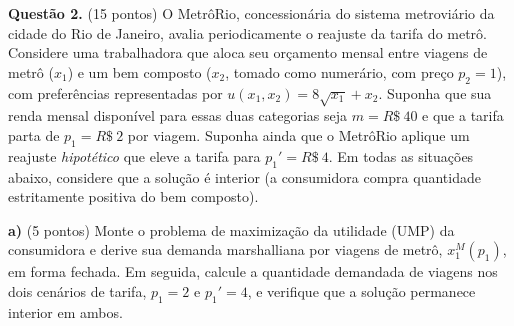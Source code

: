 
\textbf{Questão 2.} (15 pontos) O MetrôRio, concessionária do sistema metroviário da cidade do Rio de Janeiro, avalia periodicamente o reajuste da tarifa do metrô. Considere uma trabalhadora que aloca seu orçamento mensal entre viagens de metrô ($x_1$) e um bem composto ($x_2$, tomado como numerário, com preço $p_2=1$), com preferências representadas por $u(x_1,x_2)=8\sqrt{x_1}+x_2$. Suponha que sua renda mensal disponível para essas duas categorias seja $m=R\$~40$ e que a tarifa parta de $p_1=R\$~2$ por viagem. Suponha ainda que o MetrôRio aplique um reajuste \emph{hipotético} que eleve a tarifa para $p_1'=R\$~4$. Em todas as situações abaixo, considere que a solução é interior (a consumidora compra quantidade estritamente positiva do bem composto).

\textbf{a)} (5 pontos) Monte o problema de maximização da utilidade (UMP) da consumidora e derive sua demanda marshalliana por viagens de metrô, $x_1^{M}(p_1)$, em forma fechada. Em seguida, calcule a quantidade demandada de viagens nos dois cenários de tarifa, $p_1=2$ e $p_1'=4$, e verifique que a solução permanece interior em ambos.
\resolucaobox{7.6cm}

